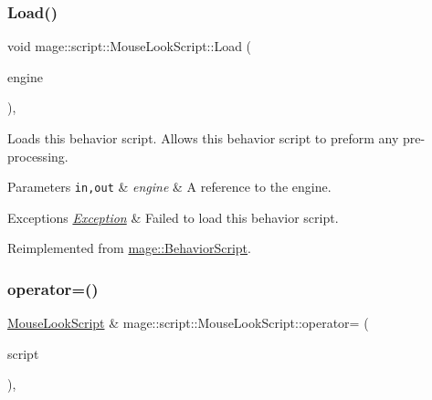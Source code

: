 \mbox{\label{classmage_1_1script_1_1_mouse_look_script_a00c8dc8ebaf67da13bd0bc45de3ad8b6}} 
\subsubsection{\texorpdfstring{Load()}{Load()}}
{\footnotesize\ttfamily void mage\+::script\+::\+Mouse\+Look\+Script\+::\+Load (\begin{DoxyParamCaption}\item[{\mbox{[}\mbox{[}maybe\+\_\+unused\mbox{]} \mbox{]} \mbox{\hyperlink{classmage_1_1_engine}{Engine}} \&}]{engine }\end{DoxyParamCaption})\hspace{0.3cm}{\ttfamily [override]}, {\ttfamily [virtual]}}

Loads this behavior script. Allows this behavior script to preform any pre-\/processing.


\begin{DoxyParams}[1]{Parameters}
\mbox{\tt in,out}  & {\em engine} & A reference to the engine. \\
\hline
\end{DoxyParams}

\begin{DoxyExceptions}{Exceptions}
{\em \mbox{\hyperlink{classmage_1_1_exception}{Exception}}} & Failed to load this behavior script. \\
\hline
\end{DoxyExceptions}


Reimplemented from \mbox{\hyperlink{classmage_1_1_behavior_script_ae7864876b2ffb1d1d8d8a56e3099f1f2}{mage\+::\+Behavior\+Script}}.

\mbox{\label{classmage_1_1script_1_1_mouse_look_script_a08731370926cbaee931170fd3fb108e6}} 
\subsubsection{\texorpdfstring{operator=()}{operator=()}\hspace{0.1cm}{\footnotesize\ttfamily [1/2]}}
{\footnotesize\ttfamily \mbox{\hyperlink{classmage_1_1script_1_1_mouse_look_script}{Mouse\+Look\+Script}} \& mage\+::script\+::\+Mouse\+Look\+Script\+::operator= (\begin{DoxyParamCaption}\item[{const \mbox{\hyperlink{classmage_1_1script_1_1_mouse_look_script}{Mouse\+Look\+Script}} \&}]{script }\end{DoxyParamCaption})\hspace{0.3cm}{\ttfamily [default]}, {\ttfamily [noexcept]}}

